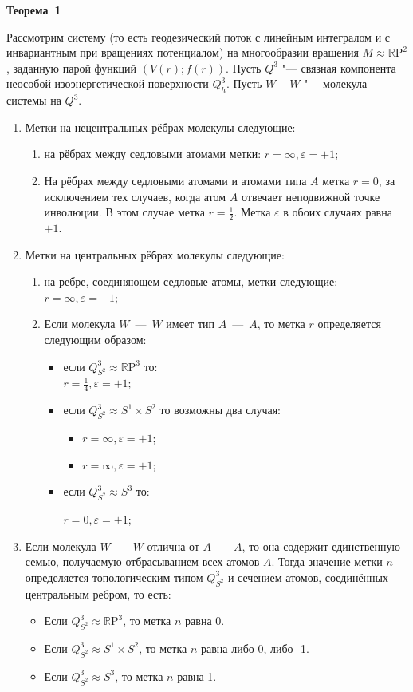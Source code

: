 \textbf{Теорема~1} \par
{Рассмотрим систему (то есть геодезический поток с линейным интегралом и с инвариантным при вращениях потенциалом) на многообразии вращения $M\approx \mathbb{R}\mathrm{P}^2$, заданную парой функций $(V(r);f(r))$.
Пусть $Q^3$ "--- связная компонента неособой изоэнергетической поверхности $Q^3_{h}$. Пусть $W -W$ "--- молекула системы на $Q^3$.
\begin{enumerate}

\item Метки на нецентральных рёбрах молекулы следующие:
\begin{enumerate}
  \item на рёбрах между седловыми атомами метки: $r=\infty, \varepsilon=+1$;
 \item
  На рёбрах между седловыми атомами и атомами типа $A$ метка $r=0$, за исключением тех случаев, когда атом $A$ отвечает неподвижной точке инволюции. В этом случае метка $r=\frac{1}{2}$. Метка $\varepsilon$ в обоих случаях равна $+1$.
\end{enumerate}
\item Метки на центральных рёбрах молекулы следующие:
\begin{enumerate}
  \item
  на ребре, соединяющем седловые атомы, метки следующие: $r=\infty, \varepsilon=-1$;
  \item
  Если молекула $W$~---~$W$ имеет тип $A$~---~$A$, то метка $r$ определяется следующим образом:
  \begin{itemize}
  \item
  если $Q^{3}_{S^2}\approx \mathbb{R}\mathrm{P}^3$ то:
\\
  $r=\frac{1}{4}, \varepsilon=+1$;

\item
если $Q^{3}_{S^2}\approx S^1\times S^2$ то возможны два случая:
  \begin{itemize}
  \item  $r=\infty, \varepsilon=+1$;
  \item $r=\infty, \varepsilon=+1$;
    \end{itemize}
\item
если $Q^{3}_{S^2}\approx S^3$ то:
\par
 $r=0, \varepsilon=+1$;
  \end{itemize}
  \end{enumerate}
\item Если молекула $W$~---~$W$ отлична от $A$~---~$A$, то она содержит единственную семью, получаемую отбрасыванием всех атомов $A$. Тогда значение метки $n$ определяется топологическим типом $Q^{3}_{S^2}$ и сечением атомов, соединённых центральным ребром, то есть:
 \begin{itemize}
  \item Если $Q^{3}_{S^2}\approx \mathbb{R}\mathrm{P}^3$, то метка $n$ равна 0.
  \item Если  $Q^{3}_{S^2}\approx S^1\times S^2$, то метка $n$ равна либо 0, либо -1.
  \item Если  $Q^{3}_{S^2}\approx S^3$, то метка $n$ равна 1.
  \end{itemize}
  \end{enumerate}



}
